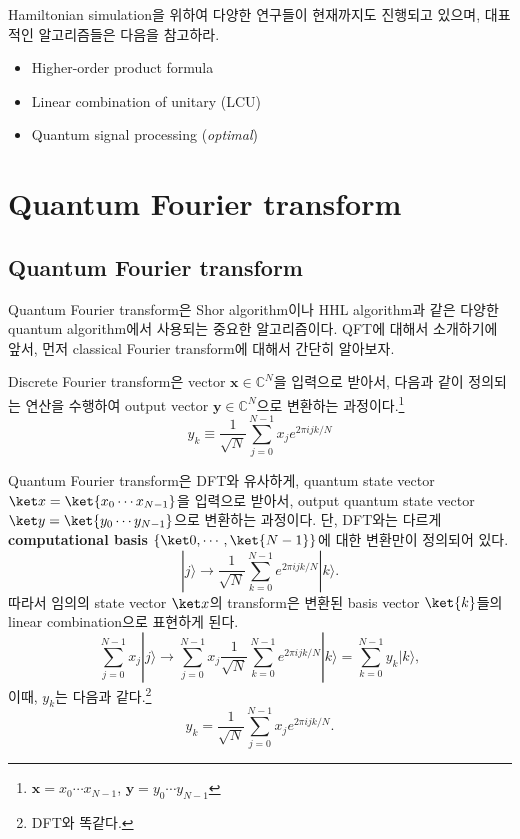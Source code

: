 Hamiltonian simulation을 위하여 다양한 연구들이 현재까지도 진행되고 있으며, 대표적인 알고리즘들은 다음을 참고하라.
\begin{itemize}
  \item Higher-order product formula \cite{childs2021theory}
  \item Linear combination of unitary (LCU) \cite{berry2015hamiltonian}
  \item Quantum signal processing (\textit{optimal}) \cite{haah2019product}
\end{itemize}

\section{Quantum Fourier transform}
\subsection{Quantum Fourier transform}
Quantum Fourier transform은 Shor algorithm이나 HHL algorithm과 같은 다양한 quantum algorithm에서 사용되는 중요한 알고리즘이다.
QFT에 대해서 소개하기에 앞서, 먼저 classical Fourier transform에 대해서 간단히 알아보자.

\begin{definition}
  Discrete Fourier transform은 vector $\mathbf x \in \mathbb C^N$을 입력으로 받아서, 다음과 같이 정의되는 연산을 수행하여 output vector $\mathbf y \in \mathbb C^N$으로 변환하는 과정이다.\footnote{$\mathbf x = x_0\cdots x_{N-1}$, $\mathbf y = y_0\cdots y_{N-1}$ }
  $$ y_k \equiv \frac{1}{\sqrt{N}} \sum_{j=0}^{N-1} x_j e^{2 \pi i j k / N} $$
\end{definition}

\begin{definition}\label{def:QFT}
  Quantum Fourier transform은 DFT와 유사하게, quantum state vector $\ket x = \ket{x_0\cdots x_{N-1}}$을 입력으로 받아서, output quantum state vector $\ket y  =\ket{ y_0\cdots y_{N-1}}$으로 변환하는 과정이다. 
  단, DFT와는 다르게 \textbf{computational basis} $\{\ket 0, \cdots, \ket{N-1}\}$에 대한 변환만이 정의되어 있다.
  $$
    |j\rangle \rightarrow \frac{1}{\sqrt{N}} \sum_{k=0}^{N-1} e^{2 \pi i j k / N}|k\rangle .
  $$
  따라서 임의의 state vector $\ket x$의 transform은 변환된 basis vector $\ket{k}$들의 linear combination으로 표현하게 된다.
  $$
    \sum_{j=0}^{N-1} x_j|j\rangle \rightarrow \sum_{j=0}^{N-1} x_j \frac{1}{\sqrt{N}} \sum_{k=0}^{N-1} e^{2 \pi i j k / N}|k\rangle=\sum_{k=0}^{N-1} y_k|k\rangle,
  $$
  이때, $y_k$는 다음과 같다.\footnote{DFT와 똑같다.}
  $$
    y_k=\frac{1}{\sqrt{N}} \sum_{j=0}^{N-1} x_j e^{2 \pi i j k / N}.
  $$
\end{definition}

